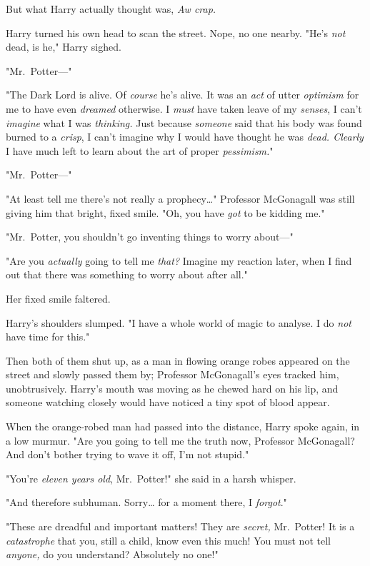 But what Harry actually thought was, \emph{Aw crap.}

Harry turned his own head to scan the street. Nope, no one nearby. "He's 
\emph{not} dead, is he," Harry sighed.

"Mr.~Potter---"

"The Dark Lord is alive. Of \emph{course} he's alive. It was an \emph{act} of 
utter \emph{optimism} for me to have even \emph{dreamed} otherwise. I 
\emph{must} have taken leave of my \emph{senses}, I can't \emph{imagine} what I 
was \emph{thinking.} Just because \emph{someone} said that his body was found 
burned to a \emph{crisp}, I can't imagine why I would have thought he was 
\emph{dead. Clearly} I have much left to learn about the art of proper 
\emph{pessimism.}"

"Mr.~Potter---"

"At least tell me there's not really a prophecy{\ldots}" Professor McGonagall 
was still giving him that bright, fixed smile. "Oh, you have \emph{got} to be 
kidding me."

"Mr.~Potter, you shouldn't go inventing things to worry about---"

"Are you \emph{actually} going to tell me \emph{that?} Imagine my reaction 
later, when I find out that there was something to worry about after all."

Her fixed smile faltered.

Harry's shoulders slumped. "I have a whole world of magic to analyse. I do 
\emph{not} have time for this."

Then both of them shut up, as a man in flowing orange robes appeared on the 
street and slowly passed them by; Professor McGonagall's eyes tracked him, 
unobtrusively. Harry's mouth was moving as he chewed hard on his lip, and 
someone watching closely would have noticed a tiny spot of blood appear.

When the orange-robed man had passed into the distance, Harry spoke again, in a 
low murmur. "Are you going to tell me the truth now, Professor McGonagall? And 
don't bother trying to wave it off, I'm not stupid."

"You're \emph{eleven years old}, Mr.~Potter!" she said in a harsh whisper.

"And therefore subhuman. Sorry{\ldots} for a moment there, I \emph{forgot}."

"These are dreadful and important matters! They are \emph{secret,} Mr.~Potter! 
It is a \emph{catastrophe} that you, still a child, know even this much! You 
must not tell \emph{anyone,} do you understand? Absolutely no one!"

